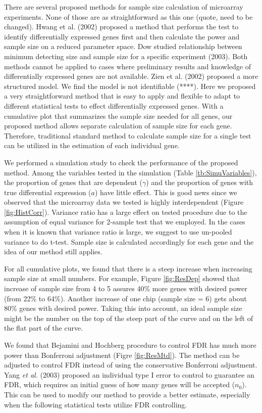 \documentclass{bioinfo}
\begin{document}
There are several proposed methods for sample size calculation of
microarray experiments. None of those are as straightforward as
this one (quote, need to be changed). Hwang et al. (2002) proposed
a method that performs the test to identify differentially
expressed genes first and then calculate the power and sample size
on a reduced parameter space. Dow studied relationship between
minimum detecting size and sample size for a specific experiment
(2003). Both methods cannot be applied to cases where preliminary
results and knowledge of differentially expressed genes are not
available. Zien et al. (2002) proposed a more structured model. We
find the model is not identifiable (****). Here we proposed a very
straightforward method that is easy to apply and flexible to adapt
to different statistical tests to effect differentially expressed
genes. With a cumulative plot that summarizes the sample size
needed for all genes, our proposed method allows separate
calculation of sample size for each gene. Therefore, traditional
standard method to calculate sample size for a single test can be
utilized in the estimation of each individual gene.

We performed a simulation study to check the performance of the
proposed method. Among the variables tested in the simulation
(Table \ref{tb:SimuVariables}), the proportion of genes that are
dependent ($\gamma$) and the proportion of genes with true
differential expression ($a$) have little effect. This is good
news since we observed that the microarray data we tested is
highly interdependent (Figure \ref{fig:HistCorr}). Variance ratio
has a large effect on tested procedure due to the assumption of
equal variance for 2-sample test that we employed. In the cases
when it is known that variance ratio is large, we suggest to use
un-pooled variance to do t-test. Sample size is calculated
accordingly for each gene and the idea of our method still
applies.

For all cumulative plots, we found that there is a steep increase when increasing sample size at small numbers. For example,
Figure \ref{fig:ResDep} showed that increase of sample size from 4 to 5 assures 40\% more genes with desired power (from 22\%
to 64\%). Another increase of one chip (sample size = 6) gets about 80\% genes with desired power. Taking this into account, an
ideal sample size might be the number on the top of the steep part of the curve and on the left of the flat part of the curve.

We found that Bejamini and Hochberg procedure to control FDR has much more power than Bonferroni adjustment (Figre
\ref{fig:ResMtd}). The method can be adjusted to control FDR instead of using the conservative Bonferroni adjustment. Yang
\textit{et al.} (2003) proposed an individual type I error to control to guarantee an FDR, which requires an initial guess of
how many genes will be accepted ($n_0$). This can be used to modify our method to provide a better estimate, especially when
the following statistical tests utilize FDR controlling.
\end{document}
